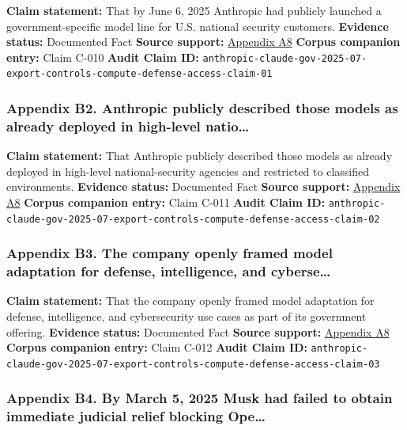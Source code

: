 \documentclass[
  american,
  11pt,
  letterpaper,
]{article}
\begin{document}
\textbf{Claim statement:} That by June 6, 2025 Anthropic had publicly
launched a government-specific model line for U.S. national security
customers. \textbf{Evidence status:} Documented Fact \textbf{Source
support:}
\hyperref[appendix-a8-claude-gov-models-for-u-s-national-security-customers]{Appendix
A8} \textbf{Corpus companion entry:} Claim C-010 \textbf{Audit Claim
ID:}
\texttt{anthropic-claude-gov-2025-07-export-controls-compute-defense-access-claim-01}

\subsubsection{Appendix B2. Anthropic publicly described those models as
already deployed in high-level
natio\ldots{}}\label{appendix-b2-anthropic-publicly-described-those-models-as-already-deployed-in-high-level-natio}

\textbf{Claim statement:} That Anthropic publicly described those models
as already deployed in high-level national-security agencies and
restricted to classified environments. \textbf{Evidence status:}
Documented Fact \textbf{Source support:}
\hyperref[appendix-a8-claude-gov-models-for-u-s-national-security-customers]{Appendix
A8} \textbf{Corpus companion entry:} Claim C-011 \textbf{Audit Claim
ID:}
\texttt{anthropic-claude-gov-2025-07-export-controls-compute-defense-access-claim-02}

\subsubsection{Appendix B3. The company openly framed model adaptation
for defense, intelligence, and
cyberse\ldots{}}\label{appendix-b3-the-company-openly-framed-model-adaptation-for-defense-intelligence-and-cyberse}

\textbf{Claim statement:} That the company openly framed model
adaptation for defense, intelligence, and cybersecurity use cases as
part of its government offering. \textbf{Evidence status:} Documented
Fact \textbf{Source support:}
\hyperref[appendix-a8-claude-gov-models-for-u-s-national-security-customers]{Appendix
A8} \textbf{Corpus companion entry:} Claim C-012 \textbf{Audit Claim
ID:}
\texttt{anthropic-claude-gov-2025-07-export-controls-compute-defense-access-claim-03}

\subsubsection{Appendix B4. By March 5, 2025 Musk had failed to obtain
immediate judicial relief blocking
Ope\ldots{}}\label{appendix-b4-by-march-5-2025-musk-had-failed-to-obtain-immediate-judicial-relief-blocking-ope}
\end{document}
